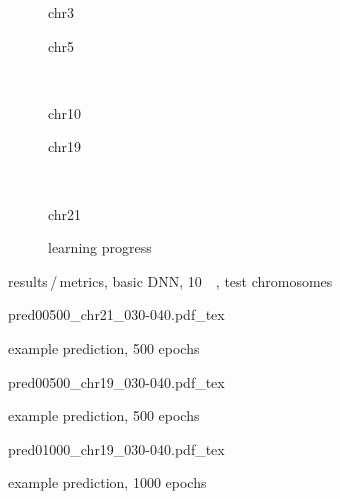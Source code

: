 \begin{figure}[p]
    \begin{subfigure}{0.45\textwidth}
        \scriptsize
        \caption{chr3}
    \end{subfigure} \hfill
    \begin{subfigure}{0.45\textwidth}
        \scriptsize
        \caption{chr5}
    \end{subfigure}\\[5mm]
    \begin{subfigure}{0.45\textwidth}
        \scriptsize
        \caption{chr10}
    \end{subfigure}\hfill
    \begin{subfigure}{0.45\textwidth}
        \scriptsize
        \caption{chr19}
    \end{subfigure}\\[3mm]
    \centering
    \begin{subfigure}{0.45\textwidth}
        \scriptsize
        \caption{chr21}
    \end{subfigure}\hfill
     \begin{subfigure}{0.45\textwidth}
        \caption{learning progress}\label{fig:results:basicDNN_lossEpochs_10}
    \end{subfigure}
    \caption{results\,/\,metrics, basic DNN, \SI{10}{\kilo\bp}, test chromosomes}
    \label{fig:results:basicDNN_10k_pearson}
\end{figure}

\begin{figure}[p]
    \scriptsize
    {pred00500_chr21_030-040.pdf_tex}
    \caption{example prediction, 500 epochs} \label{fig:results:00500_21_030-040}
\end{figure}
\begin{figure}[p]
    \scriptsize
    {pred00500_chr19_030-040.pdf_tex}
    \caption{example prediction, 500 epochs} \label{fig:results:00500_19_030-040}
\end{figure}
\begin{figure}[p]
    \scriptsize
    {pred01000_chr19_030-040.pdf_tex}
    \caption{example prediction, 1000 epochs} \label{fig:results:01000_19_030-040}
\end{figure}

